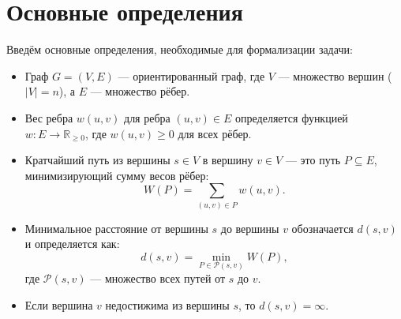 \section{Основные определения}

Введём основные определения, необходимые для формализации задачи:

\begin{itemize}
    \item Граф \(G = (V, E)\) — ориентированный граф, где \(V\) — множество вершин (\(|V| = n\)), а \(E\) — множество рёбер.
    \item Вес ребра \(w(u, v)\) для ребра \((u, v) \in E\) определяется функцией \(w : E \to \mathbb{R}_{\geq 0}\), где \(w(u, v) \geq 0\) для всех рёбер.
    \item Кратчайший путь из вершины \(s \in V\) в вершину \(v \in V\) — это путь \(P \subseteq E\), минимизирующий сумму весов рёбер:
    \[
    W(P) = \sum_{(u, v) \in P} w(u, v).
    \]
    \item Минимальное расстояние от вершины \(s\) до вершины \(v\) обозначается \(d(s, v)\) и определяется как:
    \[
    d(s, v) = \min_{P \in \mathcal{P}(s, v)} W(P),
    \]
    где \(\mathcal{P}(s, v)\) — множество всех путей от \(s\) до \(v\).
    \item Если вершина \(v\) недостижима из вершины \(s\), то \(d(s, v) = \infty\).
\end{itemize}